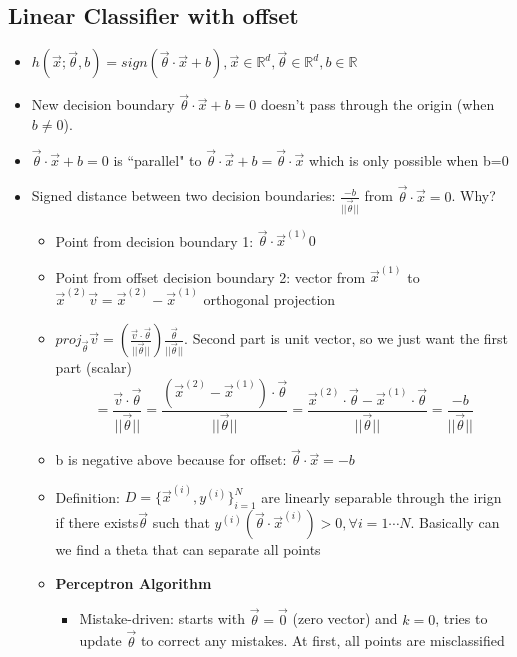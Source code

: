 \documentclass[10pt, oneside]{article}
\newcommand{\R}{\mathbb{R}}
\begin{document}
\subsection{Linear Classifier with offset}
\begin{itemize}
    \item $h(\vec x; \vec \theta, b) =sign(\vec \theta \cdot \vec x + b), \vec x \in \R^d, \vec \theta \in \R^d, b\in \R$
    \item New decision boundary $\vec \theta \cdot \vec x + b= 0$ doesn't pass through the origin (when $b\neq 0$).
    \item $\vec \theta \cdot \vec x + b = 0$ is ``parallel" to $\vec \theta \cdot \vec x+b=\vec \theta \cdot \vec x$ which is only possible when b=0
    \item Signed distance between two decision boundaries: $\frac{-b}{||\vec\theta||}$ from $\vec \theta\cdot \vec x=0$. Why?
    \begin{itemize}
        \item Point from decision boundary 1: $\vec \theta \cdot \vec x^{(1)} 0$
        \item Point from offset decision boundary 2: vector from $\vec x ^{(1)}$ to $\vec x^{(2)} \vec v = \vec x ^{(2)} - \vec x^{(1)}$ orthogonal projection
        \item $proj_{\vec \theta} \vec v= (\frac{\vec v \cdot \vec \theta}{||\vec \theta||}) \frac{\vec \theta}{||\vec \theta||}$. Second part is unit vector, so we just want the first part (scalar)
        \[
        = \frac{\vec{v} \cdot \vec{\theta}}{||\vec{\theta}||}
        = \frac{\left( \vec{x}^{(2)} - \vec{x}^{(1)} \right) \cdot \vec{\theta}}{||\vec{\theta}||}
        = \frac{\vec{x}^{(2)} \cdot \vec{\theta} - \vec{x}^{(1)} \cdot \vec{\theta}}{||\vec{\theta}||}
        = \frac{-b}{||\vec{\theta}||}
        \]
        \item b is negative above because for offset: $\vec \theta \cdot \vec x = -b$
        \item Definition: $D=\{\vec x ^{(i)}, y^{(i)}\}_{i=1}^N$ are linearly separable through the irign if there exists$\vec \theta$ such that $y^{(i)} (\vec \theta \cdot \vec x^{(i)}) > 0, \forall i= 1\cdots N$. Basically can we find a theta that can separate all points
        \item \textbf{Perceptron Algorithm}
        \begin{itemize}
            \item Mistake-driven: starts with $\vec \theta = \vec 0$ (zero vector) and $k=0$, tries to update $\vec \theta$ to correct any mistakes. At first, all points are misclassified

\end{itemize}
\end{itemize}
\end{itemize}
\end{document}
